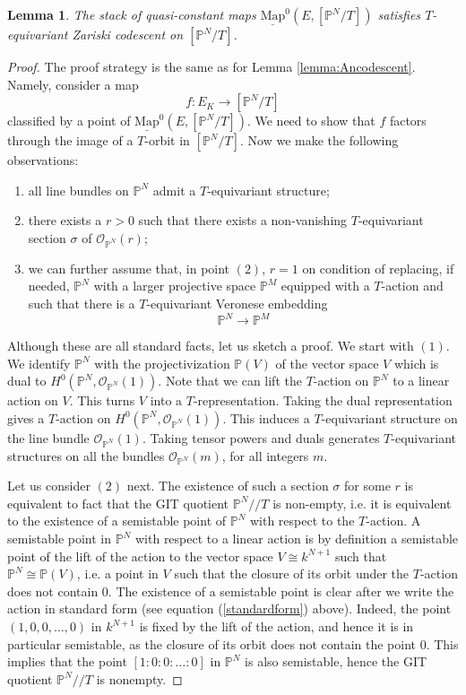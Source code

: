 \documentclass[10pt,a4paper]{amsart}
\newtheorem{lemma}{Lemma}
\newcommand{\Mapo}[2]{\underline{\mathrm{Map}}^{0}\left (#1,#2\right )}
\newcommand{\bP}{\mathbb{P}}
\newcommand{\cO}{\mathcal{O}}
\begin{document}
\begin{lemma}\label{lemma:Pncodescent}
The stack of quasi-constant maps $\Mapo{E}{[\mathbb{P}^N/T]}$ satisfies $T$-equivariant Zariski codescent on $[\mathbb{P}^N/T]$.
\end{lemma}

\begin{proof}
The proof strategy is the same as for Lemma \ref{lemma:Ancodescent}. Namely, consider a map $$f:E_K \to [\bP^N/T]$$  classified by a point of 
$\Mapo{E}{[\bP^N/T]}$. 
We need to show that $f$ factors through the image of a $T$-orbit in 
$[\mathbb{P}^N/T]$. Now we make the following observations:
\begin{enumerate}
\item all line bundles on $\mathbb{P}^N$ admit a $T$-equivariant structure;
\item there exists a $r > 0$ such that there exists a non-vanishing $T$-equivariant section $\sigma$ of $\cO_{\mathbb{P}^N}(r)$;
\item we can further assume that, in point $(2)$, $r=1$ on condition of replacing, if needed, $\mathbb{P}^N$ with a larger projective space $\mathbb{P}^M$ equipped with a $T$-action and such that there is a $T$-equivariant Veronese embedding 
$$
\mathbb{P}^N  \to \mathbb{P}^M
$$
\end{enumerate}
Although these are all standard facts, let us sketch a proof. We start with $(1)$. We identify $\mathbb{P}^N$ with the projectivization $\mathbb{P}(V)$ of the vector space $V$ which is  dual to $H^0(\bP^N,\cO_{\bP^N}(1))$. Note that we can lift the $T$-action on $\bP^N$ to a linear action on $V$. This turns $V$ into a $T$-representation. Taking the dual representation gives a  $T$-action on $H^0(\bP^N,\cO_{\bP^N}(1))$.  This induces a $T$-equivariant structure on the line bundle $\cO_{\bP^N}(1)$. Taking tensor powers and duals generates $T$-equivariant structures on all the bundles $\cO_{\bP^N}(m)$, for all integers $m$.

Let us consider $(2)$ next. The existence of such a section $\sigma$ for some $r$ is equivalent to fact that the GIT quotient $\bP^N//T$ is non-empty, i.e. it is equivalent to the existence of a semistable point of $\bP^N$ with respect to the $T$-action. A semistable point in $\bP^N$ with respect to a linear action is by definition a semistable point of the lift of the action to the vector space $V \cong k^{N+1}$ such that 
$\mathbb{P}^N \cong \mathbb{P}(V)$, i.e. a point in $V$ such that the closure of its orbit under the $T$-action does not contain $0$. The existence of a semistable point is clear after we write the action in standard form (see equation (\ref{standardform}) above). Indeed, the point $(1,0,0,\dots,0)$ in $k^{N+1}$ is fixed by the lift of the action, and hence it is in particular  semistable, as the closure of its orbit does not contain the point $0$. This implies that the point $[1:0:0:\dots:0]$ in $\bP^N$ is also semistable, hence the GIT quotient $\bP^N//T$ is nonempty. 


\end{proof}
\end{document}
